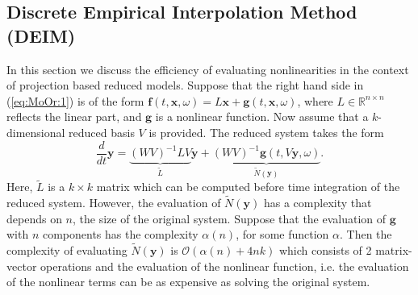 \documentclass[final]{siamart}
\begin{document}
\subsection{Discrete Empirical Interpolation Method (DEIM)} \label{chap:MoOr.DEIM:1} \nocite{Chaturantabut:2010cz}
In this section we {{\color{black}} discuss the efficiency} of evaluating nonlinearities {{\color{black}} in the context of} projection based reduced models. Suppose that the right hand side in (\ref{eq:MoOr:1}) is of the form $\mathbf f(t,\mathbf x , \omega) = L\mathbf x + \mathbf g(t,\mathbf x ,\omega)$, where $L\in \mathbb R^{n\times n}$ reflects the linear part, and $\mathbf g$ is a nonlinear function. Now {{\color{black}} assume that} a $k$-dimensional reduced basis $V$ is provided. The reduced system takes the form
\begin{equation} \label{eq:MoOr:8}
	\frac{d}{dt} \mathbf y = \underbrace{(WV)^{-1} L V}_{\tilde L} \mathbf{y} + \underbrace{(WV)^{-1} \mathbf g(t,V\mathbf y,\omega)}_{\tilde N (\mathbf y)}.
\end{equation}
Here, $\tilde L$ is a $k\times k$ matrix which can be computed before time integration of the reduced system. However, {{\color{black}} the} evaluation of $\tilde N (\mathbf y)$ has a complexity that depends on $n$, the size of the original system. Suppose that the evaluation of $\mathbf g$ with $n$ components has the complexity $\alpha(n)$, for some function $\alpha$. Then the complexity of evaluating $\tilde N(\mathbf y)$ is $\mathcal{O}(\alpha(n) + 4nk)$ which consists of 2 matrix-vector operations and the {{\color{black}} evaluation of the nonlinear function, i.e. the evaluation of the nonlinear terms can be as expensive as solving the original system.}
\end{document}
